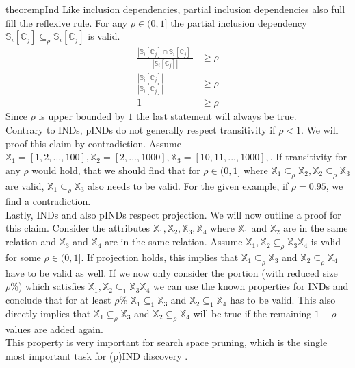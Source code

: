 \begin{restatable}{theorem}{pInd}\label{theo:pInd}
    Like inclusion dependencies, partial inclusion dependencies also full fill the reflexive rule. For any $\rho \in (0, 1]$ the partial inclusion dependency $\mathbb{S}_i[\mathbb{C}_j] \subseteq_{\rho} \mathbb{S}_i[\mathbb{C}_j]$ is valid.
    \begin{align*}
        \frac{|\mathbb{S}_i[\mathbb{C}_j] \cap \mathbb{S}_i[\mathbb{C}_j]|}
            {|\mathbb{S}_i[\mathbb{C}_j]|} & \geq \rho \\
        \frac{|\mathbb{S}_i[\mathbb{C}_j]|}
            {|\mathbb{S}_i[\mathbb{C}_j]|} & \geq \rho \\
            1 & \geq \rho
     \end{align*}
     Since $\rho$ is upper bounded by $1$ the last statement will always be true. \\

     \noindent Contrary to INDs, pINDs do not generally respect transitivity if $\rho < 1$. We will proof this claim by contradiction. Assume $\mathbb{X}_1 = [1, 2, ..., 100], \mathbb{X}_2 = [2, ..., 1000], \mathbb{X}_3 = [10, 11, ..., 1000],$. If transitivity for any $\rho$ would hold, that we should find that for $\rho \in (0, 1]$ where $\mathbb{X}_1 \subseteq_\rho \mathbb{X}_2, \mathbb{X}_2 \subseteq_\rho \mathbb{X}_3$ are valid, $\mathbb{X}_1 \subseteq_\rho \mathbb{X}_3$ also needs to be valid. For the given example, if $\rho = 0.95$, we find a contradiction. \\

     \noindent Lastly, INDs and also pINDs respect projection. We will now outline a proof for this claim. Consider the attributes $\mathbb{X}_1, \mathbb{X}_2, \mathbb{X}_3, \mathbb{X}_4$ where $\mathbb{X}_1$ and $\mathbb{X}_2$ are in the same relation and $\mathbb{X}_3$ and $\mathbb{X}_4$ are in the same relation. Assume $\mathbb{X}_1, \mathbb{X}_2 \subseteq_\rho \mathbb{X}_3 \mathbb{X}_4$ is valid for some $\rho \in (0, 1]$. If projection holds, this implies that $\mathbb{X}_1 \subseteq_\rho \mathbb{X}_3$ and $\mathbb{X}_2 \subseteq_\rho \mathbb{X}_4$ have to be valid as well. If we now only consider the portion (with reduced size $\rho\%$) which satisfies $\mathbb{X}_1, \mathbb{X}_2 \subseteq_1 \mathbb{X}_3 \mathbb{X}_4$ we can use the known properties for INDs and conclude that for at least $\rho\%$ $\mathbb{X}_1 \subseteq_1 \mathbb{X}_3$ and $\mathbb{X}_2 \subseteq_1 \mathbb{X}_4$ has to be valid. This also directly implies that $\mathbb{X}_1 \subseteq_\rho \mathbb{X}_3$ and $\mathbb{X}_2 \subseteq_\rho \mathbb{X}_4$ will be true if the remaining $1-\rho$ values are added again. \\
     This property is very important for search space pruning, which is the single most important task for (p)IND discovery \cite{liu2010discover}.
\end{restatable}

